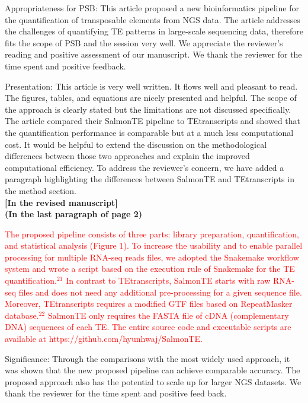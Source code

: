 \documentclass[10pt]{article}
\begin{document}
\begin{response}{Appropriateness for PSB: This article proposed a new bioinformatics pipeline for the quantification of transposable elements from NGS data. The article addresses the challenges of quantifying TE patterns in large-scale sequencing data, therefore fits the scope of PSB and the session very well.}
We appreciate the reviewer's reading and positive assessment of our manuscript.
We thank the reviewer for the time spent and positive feedback.
\end{response}
\begin{response}{Presentation: This article is very well written. It flows well and pleasant to read. The figures, tables, and equations are nicely presented and helpful. The scope of the approach is clearly stated but the limitations are not discussed specifically. The article compared their SalmonTE pipeline to TEtranscripts and showed that the quantification performance is comparable but at a much less computational cost. 
It would be helpful to extend the discussion on the methodological differences between those two approaches and explain the improved computational efficiency.}
To address the reviewer's concern, we have added a paragraph highlighting the differences between SalmonTE and TEtranscripts in the method section.
\\

\noindent\textbf{[In the revised manuscript]}  \\
\noindent\textbf{(In the last paragraph of page 2)} 

\textcolor{red}{
    The proposed pipeline consists of three parts: library preparation, quantification, and statistical analysis (Figure 1). To increase the usability and to enable parallel processing for multiple RNA-seq reads files, we adopted the Snakemake workflow system and wrote a script based on the execution rule of Snakemake for the TE quantification.$^{21}$ In contrast to TEtranscripts, SalmonTE starts with raw RNA-seq files and does not need any additional pre-processing for a given sequence file. Moreover, TEtranscripts requires a modified GTF files based on RepeatMasker database.$^{22}$ SalmonTE only requires the FASTA file of cDNA (complementary DNA) sequences of each TE. The entire source code and executable scripts are available at https://github.com/hyunhwaj/SalmonTE.
}

\end{response}
\begin{response}{Significance: Through the comparisons with the most widely used approach, it was shown that the new proposed pipeline can achieve comparable accuracy. The proposed approach also has the potential to scale up for larger NGS datasets.}
We thank the reviewer for the time spent  and positive feed back.
\end{response}
\end{document}
